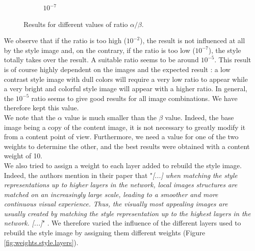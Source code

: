 \documentclass[twocolumn,superscriptaddress,aps,floatfix,nofootinbib]{revtex4-1}
\begin{document}
\begin{figure}[ht]
\begin{subfigure}[b]{0.13\textwidth}
            \caption{$10^{-7}$}
        \end{subfigure}
        \caption{Results for different values of ratio $\alpha/\beta$.}
        \label{fig:weights.ratio}
    \end{figure}
    
    We observe that if the ratio is too high ($10^{-2}$), the result is not influenced at all by the style image and, on the contrary, if the ratio is too low ($10^{-7}$), the style totally takes over the result. A suitable ratio seems to be around $10^{-5}$. This result is of course highly dependent on the images and the expected result : a low contrast style image with dull colors will require a very low ratio to appear while a very bright and colorful style image will appear with a higher ratio. In general, the $10^{-5}$ ratio seems to give good results for all image combinations. We have therefore kept this value.\\
    
    We note that the $\alpha$ value is much smaller than the $\beta$ value. Indeed, the base image being a copy of the content image, it is not necessary to greatly modify it from a content point of view. Furthermore, we need a value for one of the two weights to determine the other, and the best results were obtained with a content weight of 10.\\
    
    We also tried to assign a weight to each layer added to rebuild the style image. Indeed, the authors mention in their paper that "\emph{[...] when matching the style representations up to higher layers in the network, local images structures are matched on an increasingly large scale, leading to a smoother and more continuous visual experience. Thus, the visually most appealing images are usually created by matching the style representation up to the highest layers in the network. [...]}" \cite{DBLP:journals/corr/GatysEB15a}. We therefore varied the influence of the different layers used to rebuild the style image by assigning them different weights (Figure \ref{fig:weights.style.layers}).
\end{document}
